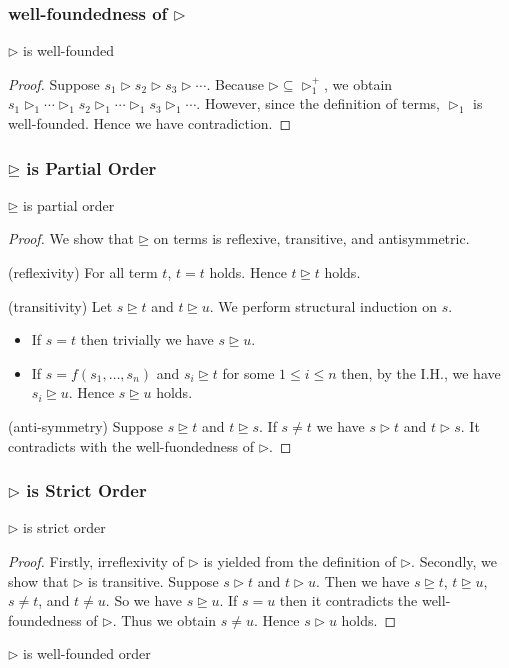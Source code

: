\documentclass[12pt,aspectratio=169]{beamer}
\begin{document}
\begin{frame}
    \frametitle{well-foundedness of $\rhd$}
    \begin{lemma}
        $\rhd$ is well-founded
    \end{lemma}
    \begin{proof}
        Suppose $s_1 \rhd s_2 \rhd s_3 \rhd \cdots$.
        Because $\rhd \subseteq \rhd_1^+$,
        we obtain $s_1 \rhd_1 \cdots \rhd_1 s_2 \rhd_1 \cdots \rhd_1 s_3 \rhd_1 \cdots$.
        However, since the definition of terms, $\rhd_1$ is well-founded.
        Hence we have contradiction.
    \end{proof}
\end{frame}

\begin{frame}
    \frametitle{$\unrhd$ is Partial Order}

    \begin{lemma}
        $\unrhd$ is partial order
    \end{lemma}

    \begin{proof}
        We show that $\unrhd$ on terms is reflexive, transitive, and antisymmetric.

        (reflexivity) For all term $t$, $t = t$ holds. Hence $t \unrhd t$ holds.

        (transitivity) Let $s \unrhd t$ and $t \unrhd u$. We perform structural induction on $s$.
        \begin{itemize}
            \item If $s = t$ then trivially we have $s \unrhd u$.
            \item If $s = f(s_1, \dots, s_n)$ and $s_i \unrhd t$ for some $1 \leq i \leq n$ then, 
            by the I.H., we have $s_i \unrhd u$. Hence $s \unrhd u$ holds.
        \end{itemize}

        (anti-symmetry) Suppose $s \unrhd t$ and $t \unrhd s$. If $s \neq t$ we have $s \rhd t$ and $t \rhd s$.
        It contradicts with the well-fuondedness of $\rhd$.
    \end{proof}
\end{frame}

\begin{frame}
    \frametitle{$\rhd$ is Strict Order}
    \begin{lemma}
        $\rhd$ is strict order
    \end{lemma}
    \begin{proof}
        Firstly, irreflexivity of $\rhd$ is yielded from the definition of $\rhd$.
        Secondly, we show that $\rhd$ is transitive. Suppose $s \rhd t$ and $t \rhd u$.
        Then we have $s \unrhd t$, $t \unrhd u$, $s \neq t$, and $t \neq u$.
        So we have $s \unrhd u$. If $s = u$ then it contradicts the well-foundedness of $\rhd$.
        Thus we obtain $s \neq u$. Hence $s \rhd u$ holds.
    \end{proof}
    \begin{corollary}
        $\rhd$ is well-founded order
    \end{corollary}
\end{frame}
\end{document}
